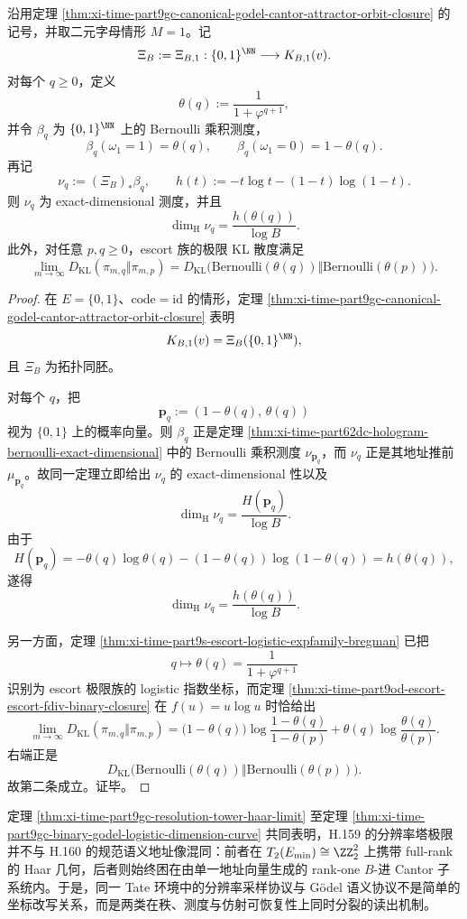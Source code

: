 \begin{theorem}\label{thm:xi-time-part9gc-binary-godel-logistic-dimension-curve}
沿用定理 \ref{thm:xi-time-part9gc-canonical-godel-cantor-attractor-orbit-closure} 的记号，并取二元字母情形 \(M=1\)。记
\[
\Xi_B:=\Xi_{B,1}:\{0,1\}^{\NN}\longrightarrow K_{B,1}(v).
\]
对每个 \(q\ge 0\)，定义
\[
\theta(q):=\frac{1}{1+\varphi^{q+1}},
\]
并令 \(\beta_q\) 为 \(\{0,1\}^{\NN}\) 上的 Bernoulli 乘积测度，
\[
\beta_q(\omega_1=1)=\theta(q),
\qquad
\beta_q(\omega_1=0)=1-\theta(q).
\]
再记
\[
\nu_q:=(\Xi_B)_*\beta_q,
\qquad
h(t):=-t\log t-(1-t)\log(1-t).
\]
则 \(\nu_q\) 为 exact-dimensional 测度，并且
\[
\dim_{\mathrm H}\nu_q=\frac{h(\theta(q))}{\log B}.
\]
此外，对任意 \(p,q\ge 0\)，escort 族的极限 KL 散度满足
\[
\lim_{m\to\infty}D_{\mathrm{KL}}(\pi_{m,q}\Vert \pi_{m,p})
=
D_{\mathrm{KL}}\!\bigl(\mathrm{Bernoulli}(\theta(q))\Vert \mathrm{Bernoulli}(\theta(p))\bigr).
\]
\end{theorem}
\begin{proof}
在 \(E=\{0,1\}\)、\(\mathrm{code}=\mathrm{id}\) 的情形，定理
\ref{thm:xi-time-part9gc-canonical-godel-cantor-attractor-orbit-closure} 表明
\[
K_{B,1}(v)=\Xi_B(\{0,1\}^{\NN}),
\]
且 \(\Xi_B\) 为拓扑同胚。

对每个 \(q\)，把
\[
\mathbf p_q:=(1-\theta(q),\,\theta(q))
\]
视为 \(\{0,1\}\) 上的概率向量。则 \(\beta_q\) 正是定理 \ref{thm:xi-time-part62dc-hologram-bernoulli-exact-dimensional} 中的 Bernoulli 乘积测度 \(\nu_{\mathbf p_q}\)，而 \(\nu_q\) 正是其地址推前 \(\mu_{\mathbf p_q}\)。故同一定理立即给出 \(\nu_q\) 的 exact-dimensional 性以及
\[
\dim_{\mathrm H}\nu_q
=
\frac{H(\mathbf p_q)}{\log B}.
\]
由于
\[
H(\mathbf p_q)
=
-\theta(q)\log\theta(q)
-(1-\theta(q))\log(1-\theta(q))
=
h(\theta(q)),
\]
遂得
\[
\dim_{\mathrm H}\nu_q=\frac{h(\theta(q))}{\log B}.
\]

另一方面，定理 \ref{thm:xi-time-part9s-escort-logistic-expfamily-bregman} 已把
\[
q\longmapsto \theta(q)=\frac{1}{1+\varphi^{q+1}}
\]
识别为 escort 极限族的 logistic 指数坐标，而定理 \ref{thm:xi-time-part9od-escort-escort-fdiv-binary-closure} 在 \(f(u)=u\log u\) 时恰给出
\[
\lim_{m\to\infty}D_{\mathrm{KL}}(\pi_{m,q}\Vert \pi_{m,p})
=
\bigl(1-\theta(q)\bigr)\log\frac{1-\theta(q)}{1-\theta(p)}
+\theta(q)\log\frac{\theta(q)}{\theta(p)}.
\]
右端正是
\[
D_{\mathrm{KL}}\!\bigl(\mathrm{Bernoulli}(\theta(q))\Vert \mathrm{Bernoulli}(\theta(p))\bigr).
\]
故第二条成立。证毕。
\end{proof}

\noindent
定理 \ref{thm:xi-time-part9gc-resolution-tower-haar-limit} 至定理 \ref{thm:xi-time-part9gc-binary-godel-logistic-dimension-curve} 共同表明，H.159 的分辨率塔极限并不与 H.160 的规范语义地址像混同：前者在 \(T_2(E_{\min})\cong \ZZ_2^2\) 上携带 full-rank 的 Haar 几何，后者则始终困在由单一地址向量生成的 rank-one \(B\)-进 Cantor 子系统内。于是，同一 Tate 环境中的分辨率采样协议与 Gödel 语义协议不是简单的坐标改写关系，而是两类在秩、测度与仿射可恢复性上同时分裂的读出机制。

\endinput

